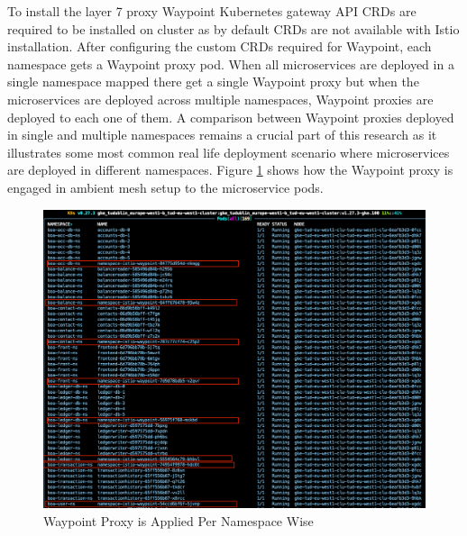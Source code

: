 To install the layer 7 proxy Waypoint Kubernetes gateway API CRDs are required to be installed on cluster as by default CRDs are not available with Istio installation. After configuring the custom CRDs required for Waypoint, each namespace gets a Waypoint proxy pod. When all microservices are deployed in a single namespace mapped there get a single Waypoint proxy but when the microservices are deployed across multiple namespaces, Waypoint proxies are deployed to each one of them. A comparison between Waypoint proxies deployed in single and multiple namespaces remains a crucial part of this research as it illustrates some most common real life deployment scenario where microservices are deployed in different namespaces. Figure \ref{method:waypointAppliedView} shows how the Waypoint proxy is engaged in ambient mesh setup to the microservice pods.

\begin{figure}[ht!]
  \centering
  \includegraphics[width=1.0\linewidth]{resources/ambient-multi-ns-l4-l7-deployed.png}
  \caption{Waypoint Proxy is Applied Per Namespace Wise}
  \label{method:waypointAppliedView}
\end{figure}


